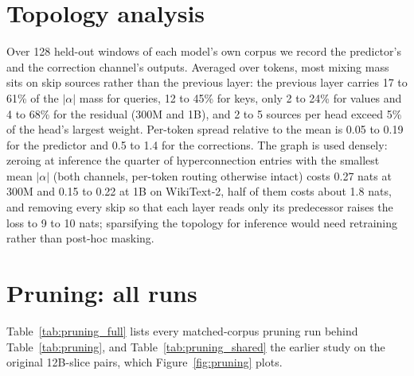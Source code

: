 \documentclass[11pt]{article}
\newcommand{\dagf}{DAGFormer}
\newcommand{\pend}{\textcolor{black!45}{\textit{run.}}}
\begin{document}


\section{Topology analysis}
\label{app:topology}
Over 128 held-out windows of each model's own corpus we record the predictor's and the correction channel's outputs. Averaged over tokens, most mixing mass sits on skip sources rather than the previous layer: the previous layer carries 17 to 61\% of the $|\alpha|$ mass for queries, 12 to 45\% for keys, only 2 to 24\% for values and 4 to 68\% for the residual (300M and 1B), and 2 to 5 sources per head exceed 5\% of the head's largest weight. Per-token spread relative to the mean is 0.05 to 0.19 for the predictor and 0.5 to 1.4 for the corrections. The graph is used densely: zeroing at inference the quarter of hyperconnection entries with the smallest mean $|\alpha|$ (both channels, per-token routing otherwise intact) costs 0.27 nats at 300M and 0.15 to 0.22 at 1B on WikiText-2, half of them costs about 1.8 nats, and removing every skip so that each layer reads only its predecessor raises the loss to 9 to 10 nats; sparsifying the topology for inference would need retraining rather than post-hoc masking.

\section{Pruning: all runs}
\label{app:prunefull}
Table~\ref{tab:pruning_full} lists every matched-corpus pruning run behind Table~\ref{tab:pruning}, and Table~\ref{tab:pruning_shared} the earlier study on the original 12B-slice pairs, which Figure~\ref{fig:pruning} plots.

\begin{table}[h]
\centering\small
\setlength{\tabcolsep}{2pt}

\caption{All matched-corpus pruning runs of Table~\ref{tab:pruning}: held-out MathInstruct NLL after 2000 steps at 0 to 70\% sparsity, and at 50\% with every router frozen during finetuning (DenseFormer's depth weights, the hyper-connection modules, MUDDFormer's routers, \dagf{}'s predictor and local correction) or, for \dagf{}, only the predictor. Bold: best per size and column. \pend{}: running.}
\label{tab:pruning_full}
\end{table}

\begin{table}[h]
\centering\small
\setlength{\tabcolsep}{2pt}

\caption{The earlier pruning study on the original 12B-slice pairs (75M to 300M) and a 150M comparison with MUDDFormer on a common corpus (150M$^\ast$): held-out NLL, the loss increase relative to the same model's unpruned finetune, and the NLL at 50\% with the predictor (\dagf{}) or every router (MUDDFormer) frozen. Bold: best per block and column.}
\label{tab:pruning_shared}
\end{table}
\end{document}
